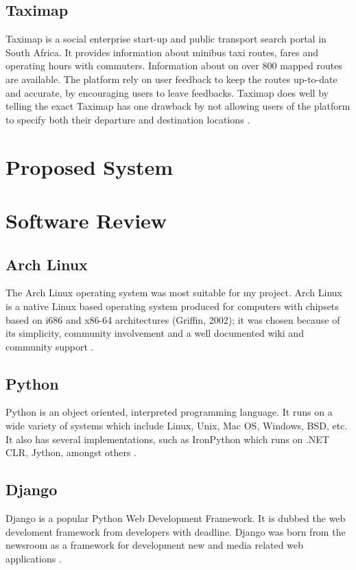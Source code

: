 
\subsection{Taximap}
Taximap is a social enterprise start-up and public transport search portal in South Africa. It provides information about minibus taxi routes, fares and operating hours with commuters. Information about on over 800 mapped routes are available. The platform rely on user feedback to keep the routes up-to-date and accurate, by encouraging users to leave feedbacks. Taximap does well by telling the exact Taximap has one drawback by not allowing users of the platform to specify both their departure and destination locations \citep{neumann_toward_2015}.


\section{Proposed System}

\section{Software Review}

\subsection{Arch Linux}
The Arch Linux operating system was most suitable for my project. Arch Linux is a native Linux based operating system produced for computers with chipsets based on i686 and x86-64 architectures (Griffin, 2002); it was chosen because of its simplicity, community involvement and a well documented wiki and community support \citep{vinet2014arch}.

\subsection{Python}
Python is an object oriented, interpreted programming language. It runs on a wide variety of systems which include Linux, Unix, Mac OS, Windows, BSD, etc. It also has several implementations, such as IronPython which runs on .NET CLR, Jython, amongst others \citep{van2007python}. 

\subsection{Django}
Django is a popular Python Web Development Framework. It is dubbed the web develoment framework from developers with deadline. Django was born from the newsroom as a framework for development new and media related web applications \citep{holovaty2009definitive}.

